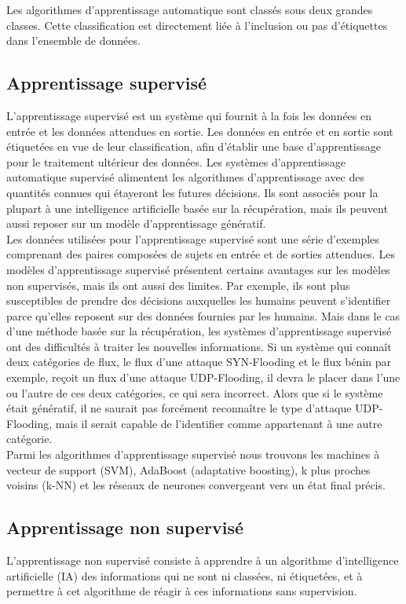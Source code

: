 \noindent Les algorithmes d’apprentissage automatique sont classés sous deux grandes classes. Cette classification est directement liée à l’inclusion ou pas d’étiquettes dans l’ensemble de données.

\subsection{Apprentissage supervisé}
L’apprentissage supervisé est un système qui fournit à la fois les données en entrée et les données attendues en sortie. Les données en entrée et en sortie sont étiquetées en vue de leur classification, afin d'établir une base d'apprentissage pour le traitement ultérieur des données.
Les systèmes d'apprentissage automatique supervisé alimentent les algorithmes d'apprentissage avec des quantités connues qui étayeront les futures décisions. Ils sont associés pour la plupart à une intelligence artificielle basée sur la récupération, mais ils peuvent aussi reposer sur un modèle d'apprentissage génératif.\\

\noindent Les données utilisées pour l'apprentissage supervisé sont une série d'exemples comprenant des paires composées de sujets en entrée et de sorties attendues.
Les modèles d'apprentissage supervisé présentent certains avantages sur les modèles non supervisés, mais ils ont aussi des limites. Par exemple, ils sont plus susceptibles de prendre des décisions auxquelles les humains peuvent s'identifier parce qu'elles reposent sur des données fournies par les humains. Mais dans le cas d'une méthode basée sur la récupération, les systèmes d'apprentissage supervisé ont des difficultés à traiter les nouvelles informations. Si un système qui connaît deux catégories de flux, le flux d’une attaque SYN-Flooding et le flux bénin par exemple, reçoit un flux d’une attaque UDP-Flooding, il devra le placer dans l'une ou l'autre de ces deux catégories, ce qui sera incorrect. Alors que si le système était génératif, il ne saurait pas forcément reconnaître le type d’attaque UDP-Flooding, mais il serait capable de l'identifier comme appartenant à une autre catégorie. \\

\noindent Parmi les algorithmes d’apprentissage supervisé nous trouvons les machines à vecteur de support (SVM),  AdaBoost (adaptative boosting), k plus proches voisins (k-NN) et les réseaux de neurones convergeant vers un état final précis.

\subsection{Apprentissage non supervisé}
L’apprentissage non supervisé consiste à apprendre à un algorithme d'intelligence artificielle (IA) des informations qui ne sont ni classées, ni étiquetées, et à permettre à cet algorithme de réagir à ces informations sans supervision.\\


